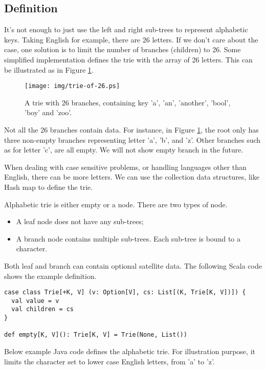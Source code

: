 \documentclass{article}
\begin{document}
\subsection{Definition}
It's not enough to just use the left and right sub-trees to represent
alphabetic keys. Taking English for example, there are 26 letters.
If we don't care about the case, one solution is to limit the number
of branches (children) to 26. Some simplified implementation defines
the trie with the array of 26 letters.
This can be illustrated as in Figure \ref{fig:trie-of-26}.

\begin{figure}[htbp]
  \centering
  \texttt{[image: img/trie-of-26.ps]}
  \caption{A trie with 26 branches, containing key 'a', 'an', 'another', 'bool',
    'boy' and 'zoo'.}
  \label{fig:trie-of-26}
\end{figure}

Not all the 26 branches contain data. For instance, in Figure \ref{fig:trie-of-26},
the root only has three non-empty branches representing letter 'a',
'b', and 'z'. Other branches such as for letter 'c', are all
empty. We will not show empty branch in the future.

When dealing with case sensitive problems, or handling languages other than English,
there can be more letters. We can use the collection data structures, like Hash map
to define the trie.

Alphabetic trie is either empty or a node. There are two types of node.

\begin{itemize}
\item A leaf node does not have any sub-trees;
\item A branch node contains multiple sub-trees. Each sub-tree is bound to a character.
\end{itemize}

Both leaf and branch can contain optional satellite data. The following Scala
code shows the example definition.

\lstset{language=Scala}
\begin{lstlisting}
case class Trie[+K, V] (v: Option[V], cs: List[(K, Trie[K, V])]) {
  val value = v
  val children = cs
}

def empty[K, V](): Trie[K, V] = Trie(None, List())
\end{lstlisting}

Below example Java code defines the alphabetic trie. For illustration purpose,
it limits the character set to lower case English letters, from 'a' to 'z'.
\end{document}
